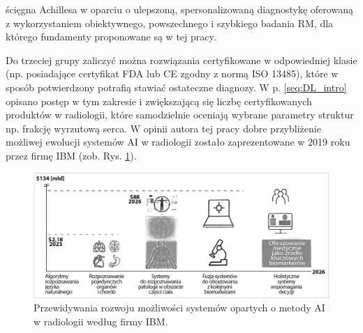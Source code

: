 ścięgna Achillesa w oparciu o ulepszoną, spersonalizowaną diagnostykę oferowaną z wykorzystaniem obiektywnego, powszechnego i szybkiego badania RM, dla którego fundamenty proponowane są w tej pracy. 

Do trzeciej grupy zaliczyć można rozwiązania certyfikowane w odpowiedniej klasie (np. posiadające certyfikat FDA lub CE zgodny z normą ISO 13485), które \linebreak w sposób potwierdzony potrafią stawiać ostateczne diagnozy. W p. \ref{seq:DL_intro} opisano postęp w tym zakresie i zwiększającą się liczbę certyfikowanych produktów w radiologii, które samodzielnie oceniają wybrane parametry struktur np. frakcję wyrzutową serca. W opinii autora tej pracy dobre przybliżenie możliwej ewolucji systemów AI \linebreak w radiologii zostało zaprezentowane w 2019 roku przez firmę IBM (zob. Rys. \ref{fig:IBM_pred}). 
\begin{figure}[h!]
	\includegraphics[width=\textwidth]{figures/Pred_AI.jpg}
	\caption{Przewidywania rozwoju możliwości systemów opartych o metody AI w radiologii według firmy IBM.}
	\label{fig:IBM_pred}
\end{figure}
